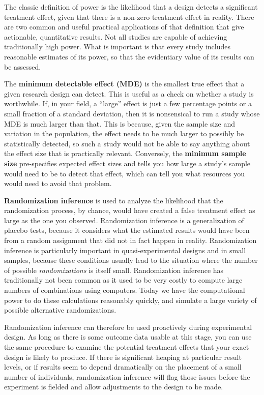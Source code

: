 The classic definition of power
is the likelihood that a design detects a significant treatment effect,
given that there is a non-zero treatment effect in reality.
There are two common and useful practical applications
of that definition that give actionable, quantitative results.
Not all studies are capable of achieving traditionally high power.
What is important is that every study includes reasonable estimates of its power,
so that the evidentiary value of its results can be assessed.

The \textbf{minimum detectable effect (MDE)}
is the smallest true effect that a given research design can detect.
This is useful as a check on whether a study is worthwhile.
If, in your field, a ``large'' effect is just a few percentage points
or a small fraction of a standard deviation,
then it is nonsensical to run a study whose MDE is much larger than that.
This is because, given the sample size and variation in the population,
the effect needs to be much larger to possibly be statistically detected,
so such a study would not be able to say anything about the effect size that is practically relevant.
Conversely, the \textbf{minimum sample size} pre-specifies expected effect sizes
and tells you how large a study's sample would need to be to detect that effect,
which can tell you what resources you would need to avoid that problem.



\textbf{Randomization inference} is used to analyze the likelihood
that the randomization process, by chance,
would have created a false treatment effect as large as the one you observed.
Randomization inference is a generalization of placebo tests,
because it considers what the estimated results would have been
from a random assignment that did not in fact happen in reality.
Randomization inference is particularly important
in quasi-experimental designs and in small samples,
because these conditions usually lead to the situation
where the number of possible \textit{randomizations} is itself small.
Randomization inference has traditionally not been common
as it used to be very costly to compute large numbers of combinations using computers.
Today we have the computational power to do these calculations reasonably quickly,
and simulate a large variety of possible alternative randomizations.


Randomization inference can therefore be used proactively during experimental design.
As long as there is some outcome data usable at this stage,
you can use the same procedure to examine the potential treatment effects
that your exact design is likely to produce.
If there is significant heaping at particular result levels,
or if results seem to depend dramatically on the placement of a small number of individuals,
randomization inference will flag those issues before the experiment is fielded
and allow adjustments to the design to be made.

